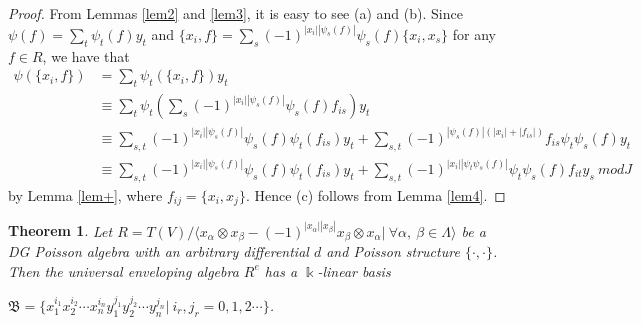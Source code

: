 \documentclass[a4paper,10pt]{amsart}
\newtheorem{theorem}{Theorem}[section]
\theoremstyle{definition}
\theoremstyle{remark}
\numberwithin{equation}{section}
\begin{document}
\begin{proof}
From Lemmas \ref{lem2} and \ref{lem3}, it is easy to see (a) and (b).
Since $\psi(f)=\sum_{t}\psi_{t}(f)y_t$ and $\{x_i,
f\}=\sum_{s}(-1)^{|x_i||\psi_s(f)|}\psi_{s}(f)\{x_i, x_s\}$ for any
$f\in R$, we have that
\begin{equation}
\begin{split}
\psi(\{x_i, f\})&=\sum_{t}\psi_{t}(\{x_i, f\})y_t\\&\equiv
\sum_{t}\psi_{t}(\sum_{s}(-1)^{|x_i||\psi_s(f)|}\psi_{s}(f)f_{is})y_t\\
&\equiv\sum_{s,
t}(-1)^{|x_i||\psi_s(f)|}\psi_{s}(f)\psi_{t}(f_{is})y_t+\sum_{s,
t}(-1)^{|\psi_{s}(f)|(|x_i|+|f_{is}|)}f_{is}\psi_{t}\psi_{s}(f)y_t\\
&\equiv\sum_{s,
t}(-1)^{|x_i||\psi_{s}(f)|}\psi_{s}(f)\psi_{t}(f_{is})y_{t}+\sum_{s,
t}(-1)^{|x_i||\psi_{t}\psi_{s}(f)|}\psi_{t}\psi_{s}(f)f_{it}y_{s}
~mod J
\end{split}\nonumber
\end{equation}
by Lemma \ref{lem+}, where $f_{ij}=\{x_i, x_j\}$. Hence (c) follows from Lemma \ref{lem4}.
\end{proof}

\begin{theorem}\label{th2}
Let $R=T(V)/\langle x_{\alpha}\otimes
x_{\beta}-(-1)^{|x_{\alpha}||x_{\beta}|}x_{\beta}\otimes x_{\alpha}|
~\forall \alpha, ~\beta \in\Lambda \rangle$ be a DG Poisson algebra
with an arbitrary differential $d$ and Poisson structure $\{\cdot, \cdot\}$.
Then the universal enveloping algebra $R^{e}$ has a $\Bbbk$-linear
basis
\begin{center}
$\mathfrak{B}=\{x_1^{i_1}x_2^{i_2}\cdots x_n^{i_n}y_1^{j_1}y_2^{j_2}\cdots y_n^{j_n}|~i_r,
j_r=0, 1, 2\cdots\}$.
 \end{center}
\end{theorem}
\end{document}
